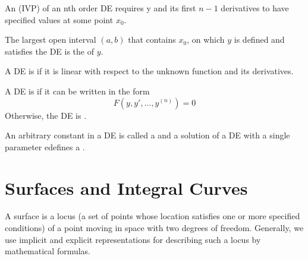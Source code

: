 

\begin{definition}[IVP]
        An  (IVP) of an nth order DE requires y and its first $n-1$ derivatives to have specified values at some point $x_0$.
\end{definition}





\begin{definition}[Validity]
        The largest open interval $(a,b)$ that contains $x_0$, on which $y$ is defined and satisfies the DE is the  of $y$.
\end{definition}





\begin{definition}[Linear]
        A DE is  if it is linear with respect to the unknown function and its derivatives.
\end{definition}




\begin{definition}[Homogeneous]
        A DE is  if it can be written in the form \begin{equation}
                F(y,y',...,y^{(n)}) = 0
        \end{equation}
        Otherwise, the DE is .
\end{definition}




\begin{definition}[Parameter]
        An arbitrary constant in a DE is called a  and a solution of a DE with a single parameter edefines a .
\end{definition}


\section{Surfaces and Integral Curves}

    \begin{definition}[Surface]
        A surface is a locus (a set of points whose location satisfies one or more specified conditions) of a point moving in space with two degrees of freedom. Generally, we use implicit and explicit representations for describing such a locus by mathematical formulas.
    \end{definition}



